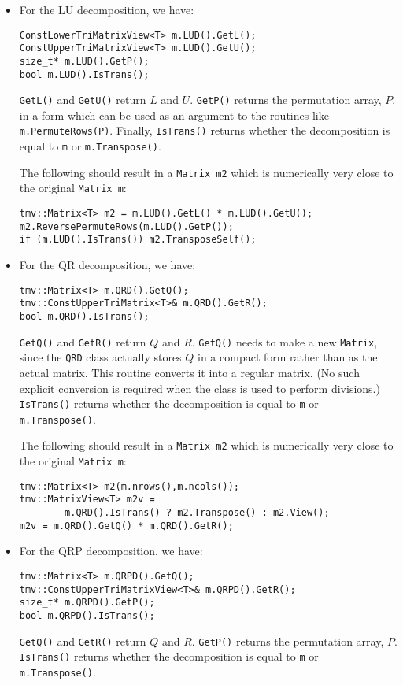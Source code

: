 \documentclass[twoside,letterpaper,11pt]{article}
\renewcommand{\tt}[1]{{\texttt {#1}}}
\begin{document}
\begin{itemize}
\item
For the LU decomposition, we have:
\begin{verbatim}
ConstLowerTriMatrixView<T> m.LUD().GetL();
ConstUpperTriMatrixView<T> m.LUD().GetU();
size_t* m.LUD().GetP();
bool m.LUD().IsTrans();
\end{verbatim}
\tt{GetL()} and \tt{GetU()} return $L$ and $U$.
\tt{GetP()} returns the permutation array, $P$, in a form
which can be used as an argument 
to the routines like \tt{m.PermuteRows(P)}.  Finally, \tt{IsTrans()} returns whether
the decomposition is equal to \tt{m} or \tt{m.Transpose()}.  

The following should result in a \tt{Matrix m2} which is numerically very close to
the original \tt{Matrix m}:
\begin{verbatim}
tmv::Matrix<T> m2 = m.LUD().GetL() * m.LUD().GetU();
m2.ReversePermuteRows(m.LUD().GetP());
if (m.LUD().IsTrans()) m2.TransposeSelf();
\end{verbatim}

\item
For the QR decomposition, we have:
\begin{verbatim}
tmv::Matrix<T> m.QRD().GetQ();
tmv::ConstUpperTriMatrix<T>& m.QRD().GetR();
bool m.QRD().IsTrans();
\end{verbatim}
\tt{GetQ()} and \tt{GetR()} return $Q$ and $R$.  \tt{GetQ()} needs to make a new
\tt{Matrix}, since the \tt{QRD} class actually stores $Q$ in a compact form
rather than as the actual matrix.  This routine converts it into a regular matrix.  
(No such explicit conversion is required when the class is used to perform divisions.)
\tt{IsTrans()} returns whether
the decomposition is equal to \tt{m} or \tt{m.Transpose()}.  

The following should result in a \tt{Matrix m2} which is numerically very close to
the original \tt{Matrix m}:
\begin{verbatim}
tmv::Matrix<T> m2(m.nrows(),m.ncols());
tmv::MatrixView<T> m2v = 
        m.QRD().IsTrans() ? m2.Transpose() : m2.View();
m2v = m.QRD().GetQ() * m.QRD().GetR();
\end{verbatim}

\item
For the QRP decomposition, we have:
\begin{verbatim}
tmv::Matrix<T> m.QRPD().GetQ();
tmv::ConstUpperTriMatrixView<T>& m.QRPD().GetR();
size_t* m.QRPD().GetP();
bool m.QRPD().IsTrans();
\end{verbatim}
\tt{GetQ()} and \tt{GetR()} return $Q$ and $R$.
\tt{GetP()} returns the permutation array, $P$.
\tt{IsTrans()} returns whether
the decomposition is equal to \tt{m} or \tt{m.Transpose()}.  


\end{itemize}
\end{document}
